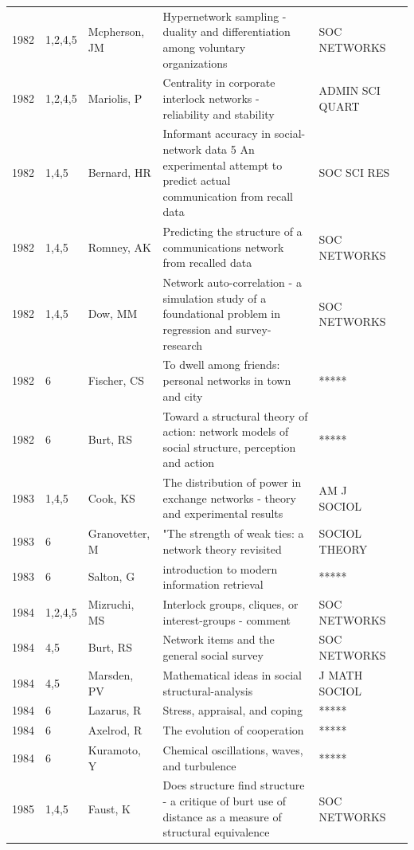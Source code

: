 \documentclass[11pt]{article} %
\begin{document}
\begin{longtable}{p{0.8cm}|p{1.25cm}|p{2.8cm}|p{7.5cm}|p{3cm}l}
1982&	1,2,4,5&	Mcpherson, JM&	 Hypernetwork sampling - duality and differentiation among voluntary organizations&         	SOC NETWORKS\\
1982&	1,2,4,5&	Mariolis, P&	 Centrality in corporate interlock networks - reliability and stability&         	ADMIN SCI QUART\\
1982&	1,4,5&	Bernard, HR&	 Informant accuracy in social-network data  5  An experimental attempt to predict actual communication from recall data&       	SOC SCI RES\\
1982&	1,4,5&	Romney, AK&	 Predicting the structure of a communications network from recalled data&         	SOC NETWORKS\\
1982&	1,4,5&	Dow, MM&	 Network auto-correlation - a simulation study of a foundational problem in regression and survey-research&         	SOC NETWORKS\\
1982&	6&	Fischer, CS&	 To dwell among friends: personal networks in town and city&         	*****\\
1982&	6&	Burt, RS &	 Toward a structural theory of action: network models of social structure, perception and action&         	*****\\
1983&	1,4,5&	Cook, KS&	 The distribution of power in exchange networks - theory and experimental results&         	AM J SOCIOL\\
1983&	6&	Granovetter, M &	"The strength of weak ties: a network theory
revisited& SOCIOL THEORY\\
1983&	6&	Salton, G&	introduction to modern information retrieval&         	*****\\
1984&	1,2,4,5&	Mizruchi, MS&	 Interlock groups, cliques, or interest-groups - comment&         	SOC NETWORKS\\
1984&	4,5&	Burt, RS&	 Network items and the general social survey&         	SOC NETWORKS\\
1984&	4,5&	Marsden, PV&	 Mathematical ideas in social structural-analysis&         	J MATH SOCIOL\\
1984&	6&	Lazarus, R&	Stress, appraisal, and coping&         	*****\\
1984&	6&	Axelrod, R&	 The evolution of cooperation&         	*****\\
1984&	6&	Kuramoto, Y &	Chemical oscillations, waves, and turbulence&         	*****\\
1985&	1,4,5&	Faust, K&	 Does structure find structure - a critique of burt use of distance as a measure of structural equivalence&         	SOC NETWORKS\\

\end{longtable}
\end{document}
